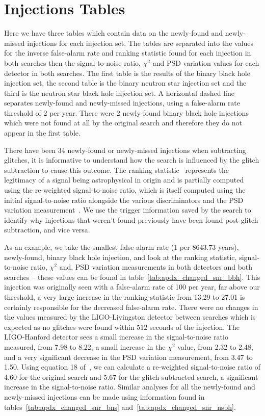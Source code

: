 \section{\label{sec:apdx_injections_table}Injections Tables}

Here we have three tables which contain data on the newly-found and newly-missed injections for each injection set. The tables are separated into the values for the inverse false-alarm rate and ranking statistic found for each injection in both searches then the signal-to-noise ratio, $\chi^{2}$ and PSD variation values for each detector in both searches. The first table is the results of the binary black hole injection set, the second table is the binary neutron star injection set and the third is the neutron star black hole injection set. A horizontal dashed line separates newly-found and newly-missed injections, using a false-alarm rate threshold of 2 per year. There were 2 newly-found binary black hole injections which were not found at all by the original search and therefore they do not appear in the first table.

There have been 34 newly-found or newly-missed \gw{} injections when subtracting \scl{} glitches, it is informative to understand how the \gw{} search is influenced by the glitch subtraction to cause this outcome. The ranking statistic~\cite{Davies:2020tsx} represents the legitimacy of a signal being astrophysical in origin and is partially computed using the re-weighted signal-to-noise ratio, which is itself computed using the initial signal-to-noise ratio alongside the various \gw{} discriminators and the PSD variation measurement~\cite{Mozzon_2020}. We use the trigger information saved by the \gw{} search to identify why injections that weren't found previously have been found post-glitch subtraction, and vice versa. 

As an example, we take the smallest false-alarm rate (1 per $8643.73$ years), newly-found, binary black hole injection, and look at the ranking statistic, signal-to-noise ratio, $\chi^{2}$ and, PSD variation measurements in both detectors and both searches -- these values can be found in table~\ref{tab:apdx_changed_snr_bbh}. This injection was originally seen with a false-alarm rate of 100 per year, far above our threshold, a very large increase in the ranking statistic from 13.29 to 27.01 is certainly responsible for the decreased false-alarm rate. There were no changes in the values measured by the LIGO-Livingston detector between searches which is expected as no \scl{} glitches were found within $512$ seconds of the injection. The LIGO-Hanford detector sees a small increase in the signal-to-noise ratio measured, from 7.98 to 8.22, a small increase in the $\chi^{2}$ value, from 2.32 to 2.48, and a very significant decrease in the PSD variation measurement, from 3.47 to 1.50. Using equation 18 of~\cite{Mozzon_2020}, we can calculate a re-weighted signal-to-noise ratio of $4.60$ for the original search and $5.67$ for the glitch-subtracted search, a significant increase in the signal-to-noise ratio. Similar analyses for all the newly-found and newly-missed injections can be made using information found in tables~\ref{tab:apdx_changed_snr_bns} and~\ref{tab:apdx_changed_snr_nsbh}.

